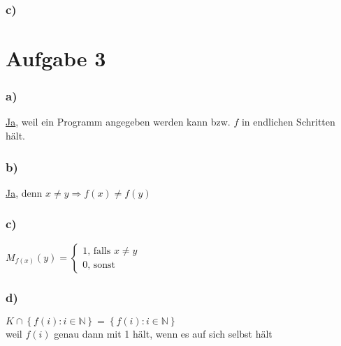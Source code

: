 \documentclass[a4paper,12pt]{article}
\begin{document}
	\subsubsection*{c)}
	
	\section*{Aufgabe 3}
	\subsubsection*{a)}
	\underline{Ja}, weil ein Programm angegeben werden kann bzw. $f$ in endlichen Schritten hält.
	\subsubsection*{b)}
	\underline{Ja}, denn $x \neq y \Rightarrow f\left(x\right) \neq f\left(y\right)$
	\subsubsection*{c)}
	$M_{f\left( x \right)} \left( y\right) = \begin{cases}
		1 \text{, falls } x \neq y\\
		0 \text{, sonst}
	\end{cases}$
	\subsubsection*{d)}
	$K \cap \left\lbrace f \left( i  \right) : i \in \mathbb{N} \right\rbrace = \left\lbrace f\left( i\right) : i \in \mathbb{N} \right\rbrace$\\
	\hspace*{1cm} weil $f\left( i\right)$ genau dann mit 1 hält, wenn es auf sich selbst hält
\end{document}
